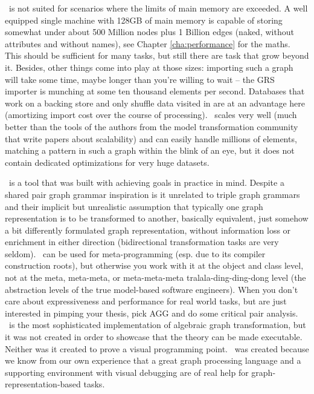 \GrG\ is not suited for scenarios where the limits of main memory are exceeded.
A well equipped single machine with 128GB of main memory is capable of storing somewhat under about 500 Million nodes plus 1 Billion edges (naked, without attributes and without names), see Chapter \ref{cha:performance} for the maths.
This should be sufficient for many tasks, but still there are task that grow beyond it.
Besides, other things come into play at those sizes: importing such a graph will take some time, maybe longer than you're willing to wait -- the GRS importer is munching at some ten thousand elements per second.
Databases that work on a backing store and only shuffle data visited in are at an advantage here (amortizing import cost over the course of processing).
\GrG\ scales very well (much better than the tools of the authors from the model transformation community that write papers about scalability) and can easily handle millions of elements, matching a pattern in such a graph within the blink of an eye, but it does not contain dedicated optimizations for very huge datasets.

\GrG\ is a tool that was built with achieving goals in practice in mind.
Despite a shared pair graph grammar inspiration is it unrelated to triple graph grammars and their implicit but unrealistic assumption that typically one graph representation is to be transformed to another, basically equivalent, just somehow a bit differently formulated graph representation, without information loss or enrichment in either direction (bidirectional transformation tasks are very seldom).
\GrG\ can be used for meta-programming (esp. due to its compiler construction roots), but otherwise you work with it at the object and class level, not at the meta, meta-meta, or meta-meta-meta tralala-ding-ding-dong level (the abstraction levels of the true model-based software engineers).
When you don't care about expressiveness and performance for real world tasks, but are just interested in pimping your thesis, pick AGG and do some critical pair analysis.
\GrG\ is the most sophisticated implementation of algebraic graph transformation, but it was not created in order to showcase that the theory can be made executable.
Neither was it created to prove a visual programming point.
\GrG\ was created because we know from our own experience that a great graph processing language and a supporting environment with visual debugging are of real help for graph-representation-based tasks.

